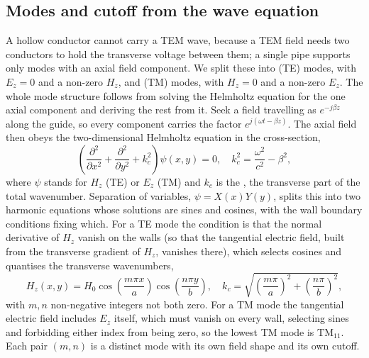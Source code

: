 \subsection{Modes and cutoff from the wave equation}

A hollow conductor cannot carry a TEM wave, because a TEM field needs
two conductors to hold the transverse voltage between them; a single
pipe supports only modes with an axial field component. We split these
into  (TE) modes, with $E_z = 0$ and a
non-zero $H_z$, and  (TM) modes, with
$H_z = 0$ and a non-zero $E_z$. The whole mode structure follows from
solving the Helmholtz equation for the one axial component and deriving
the rest from it. Seek a field travelling as $e^{-j\beta z}$ along the
guide, so every component carries the factor $e^{j(\omega t - \beta z)}$.
The axial field then obeys the two-dimensional Helmholtz equation in the
cross-section,
\[
\left(\frac{\partial^{2}}{\partial x^{2}} + \frac{\partial^{2}}
{\partial y^{2}} + k_c^2\right)\psi(x,y) = 0, \quad
k_c^2 = \frac{\omega^2}{c^2} - \beta^2,
\]
where $\psi$ stands for $H_z$ (TE) or $E_z$ (TM) and $k_c$ is the
, the transverse part of the total
wavenumber. Separation of variables, $\psi = X(x)Y(y)$, splits this into
two harmonic equations whose solutions are sines and cosines, with the
wall boundary conditions fixing which. For a TE mode the condition is
that the normal derivative of $H_z$ vanish on the walls (so that the
tangential electric field, built from the transverse gradient of $H_z$,
vanishes there), which selects cosines and quantises the transverse
wavenumbers,
\[
H_z(x,y) = H_0\cos\!\left(\frac{m\pi x}{a}\right)
\cos\!\left(\frac{n\pi y}{b}\right), \quad
k_c = \sqrt{\left(\frac{m\pi}{a}\right)^2 +
\left(\frac{n\pi}{b}\right)^2},
\]
with $m,n$ non-negative integers not both zero. For a TM mode the
tangential electric field includes $E_z$ itself, which must vanish on
every wall, selecting sines and forbidding either index from being zero,
so the lowest TM mode is $\text{TM}_{11}$. Each pair $(m,n)$ is a
distinct mode with its own field shape and its own cutoff.

